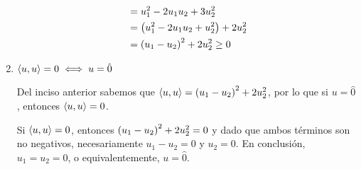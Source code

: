 \begin{solution}
\begin{enumerate}
\begin{align*}
			&= u_{1}^{2} - 2u_{1}u_{2} + 3u_{2}^{2}\\
			&= \left( u_{1}^{2} - 2u_{1}u_{2} + u_{2}^{2} \right) + 2u_{2}^{2}\\
			&= \left( u_{1} - u_{2} \right)^{2} + 2u_{2}^{2}\geq 0
		\end{align*}
		\item $\left\langle u, u \right\rangle = 0\iff u =\hat{0}$\par
		Del inciso anterior sabemos que $\left\langle u, u \right\rangle =\left( u_{1} - u_{2} \right)^{2} + 2u_{2}^{2}$, por lo que si $u =\hat{0}$, entonces $\left\langle u, u \right\rangle = 0$.\par 
		Si $\left\langle u, u \right\rangle = 0$, entonces $\left( u_{1} - u_{2} \right)^{2} + 2u_{2}^{2} = 0$ y dado que ambos términos son no negativos, necesariamente $u_{1} - u_{2} = 0$ y $u_{2} = 0$. En conclusión, $u_{1} = u_{2} = 0$, o equivalentemente, $u =\hat{0}$.
	\end{enumerate}
\end{solution}